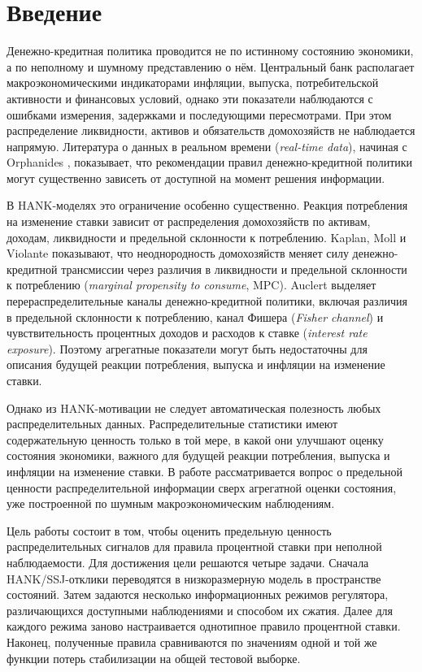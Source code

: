 \section{Введение}

Денежно-кредитная политика проводится не по истинному состоянию экономики, а по неполному и
шумному представлению о нём. Центральный банк располагает макроэкономическими индикаторами
инфляции, выпуска, потребительской активности и финансовых условий, однако эти показатели
наблюдаются с ошибками измерения, задержками и последующими пересмотрами. При этом распределение
ликвидности, активов и обязательств домохозяйств не наблюдается напрямую. Литература о данных в
реальном времени (\textit{real-time data}), начиная с Orphanides
\cite{orphanides2001realtime}, показывает, что рекомендации правил денежно-кредитной политики
могут существенно зависеть от доступной на момент решения информации.

В HANK-моделях это ограничение особенно существенно. Реакция потребления на изменение ставки
зависит от распределения домохозяйств по активам, доходам, ликвидности и предельной склонности к
потреблению. Kaplan, Moll и Violante \cite{kaplan2018hank} показывают, что неоднородность
домохозяйств меняет силу денежно-кредитной трансмиссии через различия в ликвидности и предельной
склонности к потреблению (\textit{marginal propensity to consume}, MPC). Auclert
\cite{auclert2019redistribution} выделяет перераспределительные каналы денежно-кредитной
политики, включая различия в предельной склонности к потреблению, канал Фишера
(\textit{Fisher channel}) и чувствительность процентных доходов и расходов к ставке
(\textit{interest rate exposure}). Поэтому агрегатные показатели могут быть недостаточны для
описания будущей реакции потребления, выпуска и инфляции на изменение ставки.

Однако из HANK-мотивации не следует автоматическая полезность любых распределительных данных.
Распределительные статистики имеют содержательную ценность только в той мере, в какой они
улучшают оценку состояния экономики, важного для будущей реакции потребления, выпуска и инфляции
на изменение ставки. В работе рассматривается вопрос о предельной ценности распределительной
информации сверх агрегатной оценки состояния, уже построенной по шумным макроэкономическим
наблюдениям.

Цель работы состоит в том, чтобы оценить предельную ценность распределительных сигналов для
правила процентной ставки при неполной наблюдаемости. Для достижения цели решаются четыре задачи.
Сначала HANK/SSJ-отклики переводятся в низкоразмерную модель в пространстве состояний. Затем
задаются несколько информационных режимов регулятора, различающихся доступными наблюдениями и
способом их сжатия. Далее для каждого режима заново настраивается однотипное правило процентной
ставки. Наконец, полученные правила сравниваются по значениям одной и той же функции потерь
стабилизации на общей тестовой выборке.

